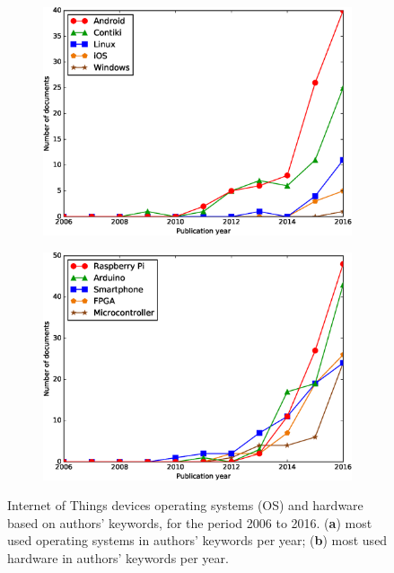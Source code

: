 \documentclass[symmetry,article,accept,moreauthors,pdftex10pt,a4paper]{mdpi}
\begin{document}
\begin{figure}[H]
	\centering
	\begin{subfigure}[b]{0.49\textwidth}
		\includegraphics[width=\textwidth]{./graphs/figure8a.eps}
		\caption{}
		\label{fig_operating_systems}
	\end{subfigure}
	\begin{subfigure}[b]{0.49\textwidth}
		\includegraphics[width=\textwidth]{./graphs/figure8b.eps}
		\caption{}
		\label{fig_hardware}
	\end{subfigure}
			\vspace{-12pt}
	\caption{Internet of Things devices operating systems (OS) and hardware based on authors' keywords, for the period 2006 to 2016. (\textbf{a}) most used operating systems in authors' keywords per year; (\textbf{b}) most used hardware in authors' keywords per year.}
	\label{fig_os_hardware}
\end{figure}
\end{document}
